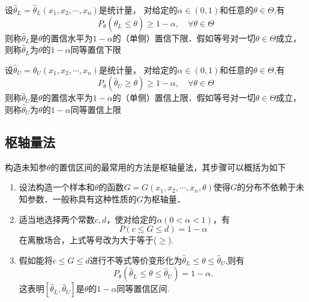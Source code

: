 \begin{definition}
    设$\hat{\theta}_{L}=\hat{\theta}_{L}(x_{1},x_{2},\cdots,x_{n})$是统计量， 对给定的$\alpha\in(0,1)$和任意的$\theta \in \Theta$,有
    \begin{equation}
        P_\theta(\hat{\theta}_L\leqslant\theta)\geqslant1-\alpha,\quad\forall\theta\in\Theta
    \end{equation}
    则称$\hat{\theta}_{L}$是$\theta$的置信水平为$1-\alpha$的（单侧）置信下限．假如等号对一切$\theta \in \Theta$成立，则称$\hat{\theta}_L$为$\theta$的$1-\alpha$同等置信下限
\end{definition}

\begin{definition}
    设$\hat{\theta}_{U}=\hat{\theta}_{U}(x_{1},x_{2},\cdots,x_{n})$是统计量， 对给定的$\alpha\in(0,1)$和任意的$\theta \in \Theta$,有
    \begin{equation}
        P_\theta(\hat{\theta}_U\geqslant \theta)\geqslant1-\alpha,\quad\forall\theta\in\Theta
    \end{equation}
    则称$\hat{\theta}_{U}$是$\theta$的置信水平为$1-\alpha$的（单侧）置信上限．假如等号对一切$\theta \in \Theta$成立，则称$\hat{\theta}_U$为$\theta$的$1-\alpha$同等置信上限
\end{definition}

\subsection{枢轴量法}
构造未知参$\theta$的置信区间的最常用的方法是枢轴量法，其步骤可以概括为如下
\begin{enumerate}[(1)]
    \item 设法构造一个样本和$\theta$的函数$G=G(x_{1},x_{2},\cdots,x_{n},\theta)$使得$G$的分布不依赖于未知参数．一般称具有这种性质的$G$为枢轴量．
    \item 适当地选择两个常数$c,d$，使对给定的$\alpha(0<\alpha<1)$，有
          \begin{equation}
              P(c\leqslant G\leqslant d)=1-\alpha
          \end{equation}
          在离散场合，上式等号改为大于等于($\geq$).
    \item 假如能将$c\leq G \leq d$进行不等式等价变形化为$\hat{\theta}_{L}\leqslant\theta\leqslant\hat{\theta}_{U}$,则有
          \begin{equation}
              P_{\theta}(\hat{\theta}_{L}\leq\theta\leq\hat{\theta}_{U})=1-\alpha.
          \end{equation}
          这表明$[\hat{\theta}_{L},\hat{\theta}_{U}]$是$\theta$的$1-\alpha$同等置信区间.
\end{enumerate}

